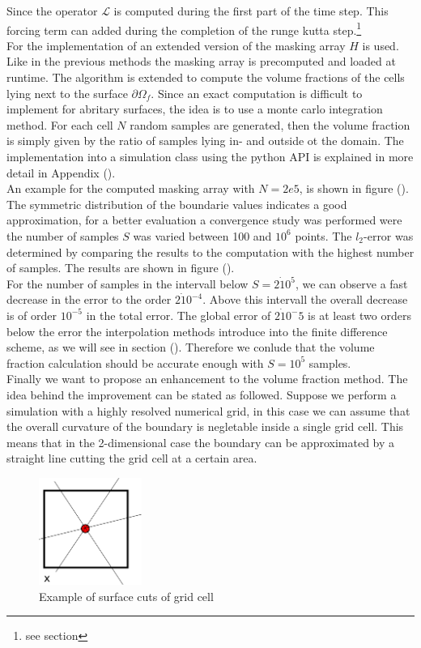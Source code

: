 Since the operator $\mathscr{L}$ is computed during the first part of the time step. This forcing term can added during the completion of the runge kutta step.\footnote{see section}\\
For the implementation of an extended version of the masking array $H$ is used.
Like in the previous methods the masking array is precomputed and loaded at runtime. The algorithm is extended to compute the
volume fractions of the cells lying next to the surface $\partial\Omega_f$.
Since an exact computation is difficult to implement for abritary surfaces, the idea is to use a monte carlo integration method.
For each cell $N$ random samples are generated, then the volume fraction is simply given by the ratio of samples lying in- and outside ot the domain.
The implementation into a simulation class using the python API is explained in more detail in Appendix ().\\
An example for the computed masking array with $N=2e5$, is shown in figure (). The symmetric distribution of the boundarie values indicates
a good approximation, for a better evaluation a convergence study was performed were the number of samples $S$ was varied between 100 and $10^6$ points.
The $l_2$-error was determined by comparing the results to the computation with the highest number of samples.
The results are shown in figure ().\\
For the number of samples in the intervall below $S=2\dot10^5$, we can observe a fast decrease in the error to the order $2\dot10^{-4}$.
Above this intervall the overall decrease is of order $10^{-5}$ in the total error.
The global error of $2\dot10^-5$ is at least two orders below the error the interpolation methods introduce into the finite difference scheme, as we will see
in section (). Therefore we conlude that the volume fraction calculation should be accurate enough with $S=10^5$ samples.\\
Finally we want to propose an enhancement to the volume fraction method. The idea behind the improvement can be stated as followed.
Suppose we perform a simulation with a highly resolved numerical grid, in this case we can assume that the overall curvature of the boundary is negletable
inside a single grid cell. This means that in the 2-dimensional case the boundary can be approximated by a straight line cutting the grid cell at a certain area.
\begin{figure}
  \begin{center}
    \includegraphics[width=0.3\textwidth]{gfx/immersed_boundary/methods/volfrac.pdf}
  \end{center}
  \caption{Example of surface cuts of grid cell}
\end{figure}
